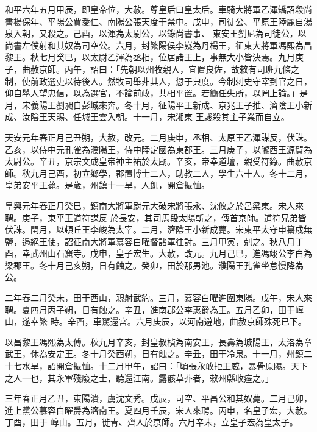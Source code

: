 \begin{pinyinscope}
 和平六年五月甲辰，即皇帝位，大赦。尊皇后曰皇太后。車騎大將軍乙渾矯詔殺尚書楊保年、平陽公賈愛仁、南陽公張天度于禁中。戊申，司徒公、平原王陸麗自湯泉入朝，又殺之。己酉，以渾為太尉公，以錄尚書事、
 東安王劉尼為司徒公，以尚書左僕射和其奴為司空公。六月，封繁陽侯李嶷為丹楊王，征東大將軍馮熙為昌黎王。秋七月癸巳，以太尉乙渾為丞相，位居諸王上，事無大小皆決焉。九月庚子，曲赦京師。丙午，詔曰：「先朝以州牧親人，宜置良佐，故敕有司班九條之制，使前政選吏以待後人。然牧司舉非其人，愆于典度。今制刺史守宰到官之日，仰自舉人望忠信，以為選官，不論前政，共相平置。若簡任失所，以罔上論。」是月，宋義陽王劉昶自彭城來奔。冬十月，征陽平王新成、京兆王子推、濟陰王小新成、汝陰王天賜、任城王雲入朝。十一月，宋湘東
 王彧殺其主子業而自立。



 天安元年春正月己丑朔，大赦，改元。二月庚申，丞相、太原王乙渾謀反，伏誅。乙亥，以侍中元孔雀為濮陽王，侍中陸定國為東郡王。三月庚子，以隴西王源賀為太尉公。辛丑，京宗文成皇帝神主祐於太廟。辛亥，帝幸道壇，親受符籙。曲赦京師。秋九月己酉，初立鄉學，郡置博士二人，助教二人，學生六十人。冬十二月，皇弟安平王薨。是歲，州鎮十一旱，人飢，開倉振恤。



 皇興元年春正月癸巳，鎮南大將軍尉元大破宋將張永、沈攸之於呂梁東。宋人來聘。庚子，東平王道符謀反
 於長安，其司馬段太陽斬之，傳首京師。道符兄弟皆伏誅。閏月，以頓丘王李峻為太宰。二月，濟陰王小新成薨。宋東平太守申纂戍無鹽，遏絕王使，詔征南大將軍慕容白曜督諸軍往討。三月甲寅，剋之。秋八月丁酉，幸武州山石窟寺。戊申，皇子宏生。大赦，改元。九月己巳，進馮翊公李白為梁郡王。冬十月己亥朔，日有蝕之。癸卯，田於那男池。濮陽王孔雀坐怠慢降為公。



 二年春二月癸未，田于西山，親射武豹。三月，慕容白曜進圍東陽。戊午，宋人來聘。夏四月丙子朔，日有蝕之。辛丑，進南郡公李惠爵為王。五月乙卯，田于崞山，遂幸繁
 畤。辛酉，車駕還宮。六月庚辰，以河南避地，曲赦京師殊死已下。



 以昌黎王馮熙為太傅。秋九月辛亥，封皇叔楨為南安王，長壽為城陽王，太洛為章武王，休為安定王。冬十月癸酉朔，日有蝕之。辛丑，田于冷泉。十一月，州鎮二十七水旱，詔開倉振恤。十二月甲午，詔曰：「頃張永敢拒王威，暴骨原隰。天下之人一也，其永軍殘廢之士，聽還江南。露骸草莽者，敕州縣收瘞之。」



 三年春正月乙丑，東陽潰，虜沈文秀。戊辰，司空、平昌公和其奴薨。二月己卯，進上黨公慕容白曜爵為濟南王。夏四月壬辰，宋人來聘。丙申，名皇子宏，大赦。丁酉，田于
 崞山。五月，徙青、齊人於京師。六月辛未，立皇子宏為皇太子。




\end{pinyinscope}
